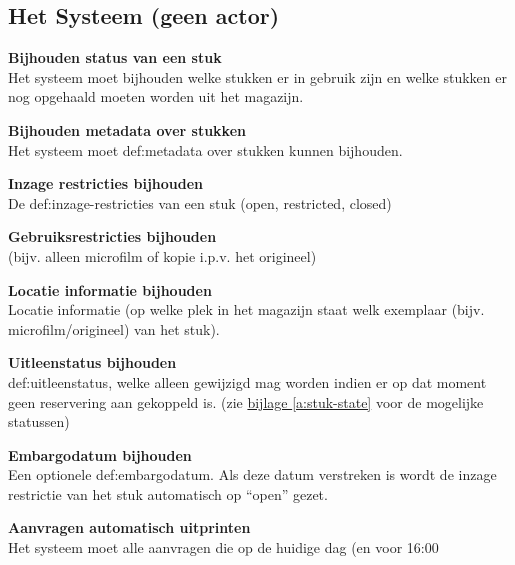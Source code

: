 \documentclass[a4paper,titlepage]{report}
\makeatletter
\def\nameddisplayedlabel#1#2{
  \label{#1}
  \begingroup
   \def\@currentlabel{#2}%
   \label{#1:name}\endgroup
   \textbf{#2}\hfill\\
}
\makeatother
\begin{document}
   \subsection{Het Systeem (geen actor)}
      \begin{enumerate}[label={[F:\arabic*]},resume]
        \item\nameddisplayedlabel{f:status}{Bijhouden status van een stuk}
          Het systeem moet bijhouden welke stukken er in gebruik zijn en welke stukken
          er nog opgehaald moeten worden uit het magazijn.
        \item\nameddisplayedlabel{f:metadata}{Bijhouden metadata over stukken}
          Het systeem moet \gls{def:metadata} over stukken kunnen bijhouden.
          \begin{enumerate}[label={[F:\arabic{enumi}\alph*]}]
            \item\nameddisplayedlabel{f:metadata_toestemming}{Inzage restricties
            bijhouden}
              De \glspl{def:inzage-restrictie} van een stuk (open, restricted, closed)
            \item\nameddisplayedlabel{f:metadata_gebruiks_toestemming}{Gebruiksrestricties
            bijhouden}
               (bijv. alleen microfilm of kopie i.p.v. het origineel)
            \item\nameddisplayedlabel{f:metadata_locatie}{Locatie informatie
            bijhouden}
              Locatie informatie (op welke plek in het magazijn staat welk
              exemplaar (bijv. microfilm/origineel) van het stuk).
            \item\nameddisplayedlabel{f:metadata_uitleenstatus}{Uitleenstatus
            bijhouden}
              \Gls{def:uitleenstatus}, welke alleen gewijzigd mag worden indien er op
              dat moment geen reservering aan gekoppeld is. (zie
              \hyperref[a:stuk-state]{bijlage \ref{a:stuk-state}} voor de
              mogelijke statussen)
            \item\nameddisplayedlabel{f:metadata_embargo}{Embargodatum
            bijhouden}
              Een optionele \gls{def:embargodatum}. Als deze datum verstreken is wordt
              de inzage restrictie van het stuk automatisch op ``open'' gezet.
          \end{enumerate}
        \item\nameddisplayedlabel{f:auto-print}{Aanvragen automatisch uitprinten}
          Het systeem moet alle aanvragen die op de huidige dag (en voor 16:00

\end{enumerate}
\end{document}
